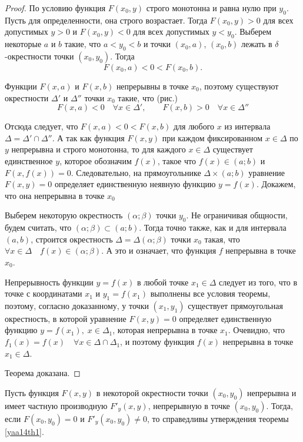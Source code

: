 \begin{proof}
По условию функция $F(x_0,y)$ строго монотонна и равна нулю при  $y_0$. Пусть для определенности, она строго возрастает. Тогда $F(x_0,y)>0$ для всех допустимых $y>0$ и $F(x_0,y)<0$ для всех допустимых $y<y_0$.
Выберем некоторые $a$ и $b$ такие, что $a<y_0<b$ и точки $(x_0,a)$, $(x_0,b)$ лежать в $\delta$-окрестности точки $(x_0,y_0)$. Тогда
$$
F(x_0,a)<0<F(x_0,b).
$$

Функции $F(x,a)$ и $F(x,b)$ непрерывны в точке $x_0$, поэтому существуют окрестности $\Delta'$ и $\Delta''$ точки $x_0$ такие, что (рис.)
$$
F(x,a)<0 \quad \forall x\in \Delta', \qquad F(x,b)>0\quad \forall x\in \Delta''
$$


Отсюда следует, что $F(x,a)<0<F(x,b)$ для любого $x$ из интервала $\Delta = \Delta'\cap\Delta''$. А так как функция $F(x,y)$ при каждом фиксированном $x\in\Delta$ по $y$ непрерывна и строго монотонна, то для каждого $x\in \Delta$ существует единственное $y$, которое обозначим $f(x)$, такое что $f(x)\in(a;b)$ и $F(x,f(x))=0$. Следовательно, на прямоугольнике $\Delta\times(a;b)$ уравнение $F(x,y)=0$ определяет единственную неявную функцию $y=f(x)$. Докажем, что она непрерывна в точке $x_0$

Выберем некоторую окрестность $(\alpha;\beta)$ точки $y_0$. Не ограничивая общности, будем считать, что $(\alpha;\beta)\subset (a;b)$. Тогда точно также, как и для интервала $(a,b)$, строится окрестность $\Delta=\Delta(\alpha;\beta)$ точки $x_0$ такая, что $\forall x\in\Delta \quad f(x)\in(\alpha;\beta)$. А это и означает, что функция $f$ непрерывна в точке $x_0$.

Непрерывность функции $y=f(x)$ в любой точке $x_1\in\Delta$ следует из того, что в точке с координатами $x_1$ и $y_1=f(x_1)$ выполнены все условия теоремы, поэтому, согласно доказанному, у точки $(x_1,y_1)$ существует прямоугольная окрестность, в которой уравнение $F(x,y)=0$ определяет единственную функцию $y=f(x_1),\;x\in\Delta_1$, которая непрерывна в точке $x_1$. Очевидно, что $f_1(x)=f(x)\quad \forall x\in\Delta\cap\Delta_1$, и поэтому функция $f(x)$ непрерывна в точке $x_1\in\Delta$.

Теорема доказана.
\end{proof}

\begin{cons}
Пусть функция $F(x,y)$ в некоторой окрестности точки $(x_0,y_0)$ непрерывна и имеет частную производную $F'_y(x,y)$, непрерывную в точке $(x_0,y_0)$. Тогда, если $F(x_0,y_0)=0$ и $F'_y(x_0,y_0)\ne 0 $, то справедливы утверждения теоремы \ref{yaa14th1}.
\end{cons}

